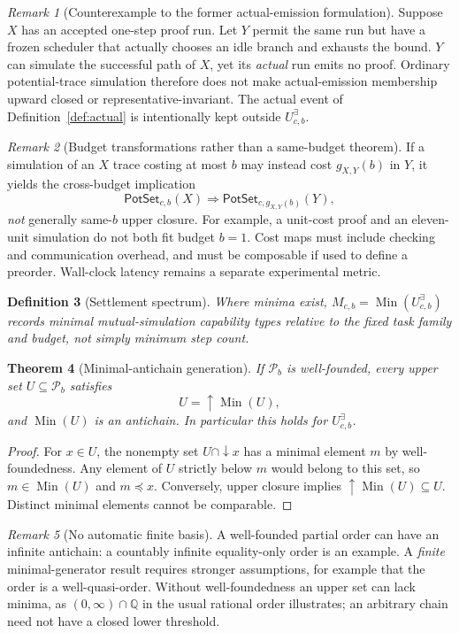 \documentclass[11pt,letterpaper]{article}
\newtheorem{definition}{Definition}[section]
\newtheorem{theorem}[definition]{Theorem}
\theoremstyle{remark}
\newtheorem{remark}[definition]{Remark}
\begin{document}
\begin{remark}[Counterexample to the former actual-emission formulation]\label{rem:counter}
Suppose $X$ has an accepted one-step proof run. Let $Y$ permit the same run but have a frozen scheduler that actually chooses an idle branch and exhausts the bound. $Y$ can simulate the successful path of $X$, yet its \emph{actual} run emits no proof. Ordinary potential-trace simulation therefore does not make actual-emission membership upward closed or representative-invariant. The actual event of Definition~\ref{def:actual} is intentionally kept outside $U^{\exists}_{c,b}$.
\end{remark}
\begin{remark}[Budget transformations rather than a same-budget theorem]
If a simulation of an $X$ trace costing at most $b$ may instead cost $g_{X,Y}(b)$ in $Y$, it yields the cross-budget implication
\[\mathsf{PotSet}_{c,b}(X)\Longrightarrow\mathsf{PotSet}_{c,g_{X,Y}(b)}(Y),\]
\emph{not} generally same-$b$ upper closure. For example, a unit-cost proof and an eleven-unit simulation do not both fit budget $b=1$. Cost maps must include checking and communication overhead, and must be composable if used to define a preorder. Wall-clock latency remains a separate experimental metric.
\end{remark}
\begin{definition}[Settlement spectrum]
Where minima exist, $M_{c,b}=\operatorname{Min}(U^{\exists}_{c,b})$ records minimal \emph{mutual-simulation capability types} relative to the fixed task family and budget, not simply minimum step count.
\end{definition}
\begin{theorem}[Minimal-antichain generation]\label{thm:antichain}
If $\mathcal P_b$ is well-founded, every upper set $U\subseteq\mathcal P_b$ satisfies
\[U=\uparrow\operatorname{Min}(U),\]
and $\operatorname{Min}(U)$ is an antichain. In particular this holds for $U^{\exists}_{c,b}$.
\end{theorem}
\begin{proof}
For $x\in U$, the nonempty set $U\cap\downarrow x$ has a minimal element $m$ by well-foundedness. Any element of $U$ strictly below $m$ would belong to this set, so $m\in\operatorname{Min}(U)$ and $m\preccurlyeq x$. Conversely, upper closure implies $\uparrow\operatorname{Min}(U)\subseteq U$. Distinct minimal elements cannot be comparable.
\end{proof}
\begin{remark}[No automatic finite basis]
A well-founded partial order can have an infinite antichain: a countably infinite equality-only order is an example. A \emph{finite} minimal-generator result requires stronger assumptions, for example that the order is a well-quasi-order. Without well-foundedness an upper set can lack minima, as $(0,\infty)\cap\mathbb Q$ in the usual rational order illustrates; an arbitrary chain need not have a closed lower threshold.
\end{remark}
\end{document}

